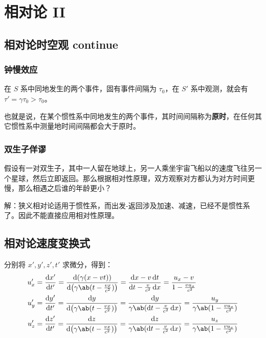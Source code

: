 \section{相对论 II}

\subsection{相对论时空观 continue}

\subsubsection{钟慢效应}

在 $S$ 系中同地发生的两个事件，固有事件间隔为 $\tau_0$，在 $S'$ 系中观测，就会有 $\tau' = \gamma \tau_0 > \tau_0$。

也就是说，在某个惯性系中同地发生的两个事件，其时间间隔称为\textbf{原时}，在任何其它惯性系中测量地时间间隔都会大于原时。

\subsubsection{双生子佯谬}

假设有一对双生子，其中一人留在地球上，另一人乘坐宇宙飞船以的速度飞往另一个星球，然后立即返回。那么根据相对性原理，双方观察对方都认为对方时间更慢，那么相遇之后谁的年龄更小？

解：狭义相对论适用于惯性系，而出发-返回涉及加速、减速，已经不是惯性系了。因此不能直接应用相对性原理。

\subsection{相对论速度变换式}

分别将 $x', y', z', t'$ 求微分，得到：
$$
\begin{aligned}
    u_x' & = \dv{x'}{t'} = \frac{\dd(\gamma (x - v t))}{\dd(\gamma \ab(t - \frac{v x}{c^2}))} = \frac{\dd{x} - v \dd{t}}{\dd{t} - \frac{v}{c^2} \dd{x}} = \frac{u_x - v}{1 - \frac{v u_x}{c^2}} \\
    u_y' & = \dv{y'}{t'} = \frac{\dd{y}}{\dd(\gamma \ab(t - \frac{v x}{c^2}))} = \frac{\dd{y}}{\gamma \ab(\dd{t} - \frac{v}{c^2} \dd{x})} = \frac{u_y}{\gamma \ab(1 - \frac{v u_x}{c^2})} \\
    u_z' & = \dv{z'}{t'} = \frac{\dd{z}}{\dd(\gamma \ab(t - \frac{v x}{c^2}))} = \frac{\dd{z}}{\gamma \ab(\dd{t} - \frac{v}{c^2} \dd{x})} = \frac{u_z}{\gamma \ab(1 - \frac{v u_x}{c^2})} \\
\end{aligned}
$$

